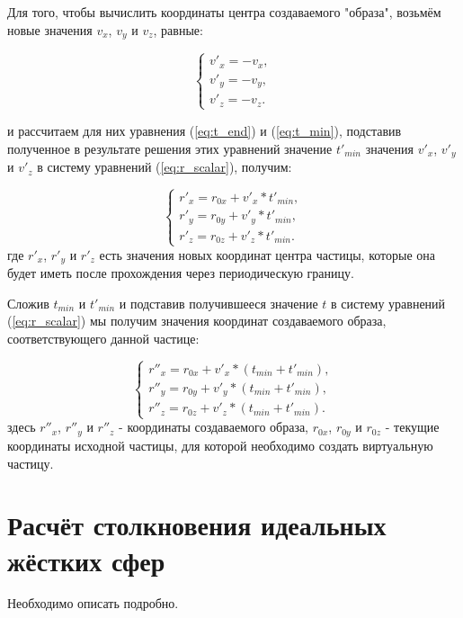 \documentclass[a4paper]{article}
\begin{document}
Для того, чтобы вычислить координаты центра создаваемого "образа", возьмём новые значения $ v_x $, $ v_y $ и $ v_z $, равные:

\begin{equation}
    \begin{cases}
        v'_x = - v_x,
        \\
        v'_y = - v_y,
        \\
        v'_z = -v_z.
    \end{cases}
\end{equation}

и рассчитаем для них уравнения (\ref{eq:t_end}) и (\ref{eq:t_min}), подставив полученное в результате решения этих уравнений значение $ t'_{min} $  значения $ v'_x $, $ v'_y $ и $ v'_z $ в систему уравнений (\ref{eq:r_scalar}), получим:

\begin{equation}
    \begin{cases}
        r'_x = r_{0x} + v'_x * t'_{min},
        \\
        r'_y = r_{0y} + v'_y * t'_{min},
        \\
        r'_z = r_{0z} + v'_z * t'_{min}.
    \end{cases}
\end{equation}
где $ r'_x $, $ r'_y $ и $ r'_z $ есть значения новых координат центра частицы, которые она будет иметь после прохождения через периодическую границу.

Сложив $ t_{min} $ и $ t'_{min} $ и подставив получившееся значение $ t $ в систему уравнений (\ref{eq:r_scalar}) мы получим значения координат создаваемого образа, соответствующего данной частице:

\begin{equation}
    \begin{cases}
        r''_x = r_{0x} + v'_x * (t_{min} + t'_{min}),
        \\
        r''_y = r_{0y} + v'_y * (t_{min} + t'_{min}),
        \\
        r''_z = r_{0z} + v'_z * (t_{min} + t'_{min}).
    \end{cases}
\end{equation}
здесь $ r''_x $, $ r''_y $ и $ r''_z $ - координаты создаваемого образа, $ r_{0x} $, $ r_{0y} $ и $ r_{0z} $ - текущие координаты исходной частицы, для которой необходимо создать виртуальную частицу.


\newpage
\section{Расчёт столкновения идеальных жёстких сфер}
Необходимо описать подробно.
\end{document}
